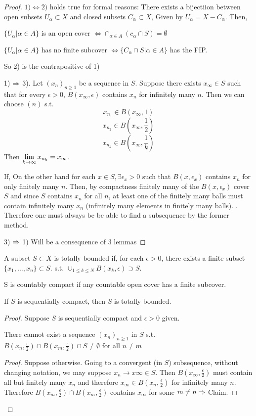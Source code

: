 \begin{proof}
$1) \Leftrightarrow 2)$ holds true for formal reasons:
There exists a bijectiion between open subsets $U_\alpha \subset X$ and closed subsets $C_\alpha\subset X$, Given by $U_\alpha = X-C_\alpha$. Then,\par
$\{U_\alpha|\alpha\in A\}$ is an open cover $\Leftrightarrow \cap_{\alpha\in A} (c_\alpha \cap S) = \emptyset$ \par 
$\{ U_\alpha | \alpha \in A\}$ has no finite subcover $\Leftrightarrow \{C_\alpha \cap S|\alpha\in A\}$ has the FIP. \par 
So 2) is the contrapositive of 1)\par
1) $\Rightarrow$ 3). Let $(x_n)_{n\geq 1}$ be a sequence in $S$. Suppose there exists $x_\infty \in S$ such that for every $\epsilon>0$, $B(x_\infty,\epsilon)$ contains $x_n$ for infinitely many $n$. Then we can choose $(n)$ s.t.
\[ x_{n_1} \in B(x_\infty,1) \]
\[ x_{n_2} \in B\left(x_\infty,\frac{1}{2}\right) \]
\[ x_{n_k} \in B\left(x_\infty,\frac{1}{k}\right)\]
Then $\lim\limits_{k\to\infty} x_{n_k} = x_\infty$. \par 
If, On the other hand for each $x\in S, \exists \epsilon_x> 0$ such that $B(x,\epsilon_x)$ contains $x_n$ for  only finitely many $n$. Then, by compactness finitely many of the $B(x,\epsilon_x)$ cover $S$ and since $S$ contains $x_n$ for all $n$, at least one of the finitely many balls must contain infinitely many $x_n$ (infinitely many elements in finitely many balls). .
Therefore one must always be be able to find a subsequence by the former method. \par 
3) $\Rightarrow$ 1) Will be a consequence of 3 lemmas
\end{proof}
\begin{mydef}
A subset $S \subset X$ is totally bounded if, for each $\epsilon>0$, there exists a finite subset $\{x_1,\ldots,x_n\}\subset S$. s.t. $\cup_{1\leq k \leq N} B(x_k,\epsilon) \supset S$. 
\end{mydef}
\begin{mydef}
S is countably compact if any countable open cover has a finite subcover.
\end{mydef}
\begin{lemma}
If $S$ is sequentially compact, then $S$ is totally bounded. 
\begin{proof}
Suppose $S$ is sequentially compact and $\epsilon>0$ given.
\begin{claim}
There cannot exist a sequence $(x_n)_{n\geq 1}$ in $S$ s.t. $B(x_n,\frac{\epsilon}{2}) \cap B(x_m,\frac{\epsilon}{2}) \cap S \neq \emptyset$ for all $n\neq m$
\begin{proof}
Suppose otherwise. Going to a convergent (in $S$) subsequence, without changing notation, we may suppose $x_n\to x\infty \in S$. Then $B(x_\infty,\frac{\epsilon}{2})$ must contain all but finitely many $x_n$ and therefore $x_\infty \in B(x_n,\frac{\epsilon}{2})$ for infinitely many $n$. Therefore $B(x_m,\frac{\epsilon}{2})\cap B(x_m,\frac{\epsilon}{2})$ contains $x_\infty$ for some $m\neq n \Rightarrow$ Claim.
\end{proof}
\end{claim}
\end{proof}
\end{lemma}


